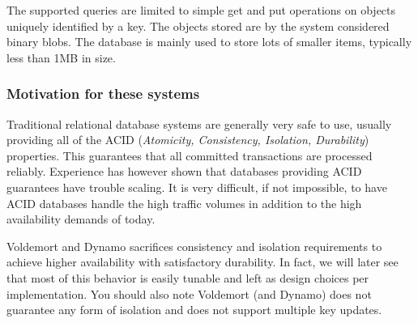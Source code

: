 The supported queries are limited to simple get and put operations on objects uniquely identified by a key. 
The objects stored are by the system considered binary blobs.
The database is mainly used to store lots of smaller items, typically less than 1MB in size.

\subsubsection{Motivation for these systems}
Traditional relational database systems are generally very safe to use, usually providing all of the ACID (\emph{Atomicity, Consistency, Isolation, Durability}) properties.
This guarantees that all committed transactions are processed reliably.
Experience has however shown that databases providing ACID guarantees have trouble scaling. It is very difficult, if not impossible, to have ACID databases handle the high traffic volumes in addition to the high availability demands of today.

Voldemort and Dynamo sacrifices consistency and isolation requirements to achieve higher availability with satisfactory durability.
In fact, we will later see that most of this behavior is easily tunable and left as design choices per implementation.
You should also note Voldemort (and Dynamo) does not guarantee any form of isolation and does not support multiple key updates.



